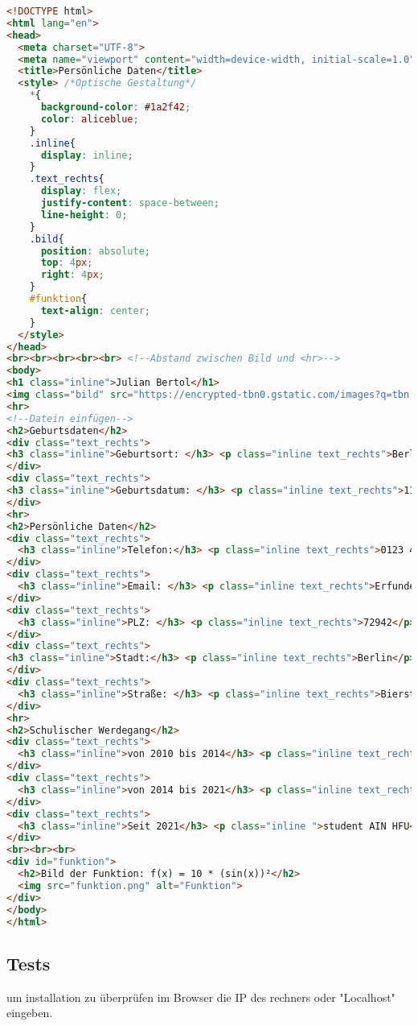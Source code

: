 \documentclass[a4paper,11pt,titlepage]{article}
\begin{document}
\begin{lstlisting}[language=HTML]
<!DOCTYPE html>
<html lang="en">
<head>
  <meta charset="UTF-8">
  <meta name="viewport" content="width=device-width, initial-scale=1.0">
  <title>Persönliche Daten</title>
  <style> /*Optische Gestaltung*/
    *{
      background-color: #1a2f42;
      color: aliceblue;
    }
    .inline{
      display: inline;
    }
    .text_rechts{
      display: flex;
      justify-content: space-between;
      line-height: 0;
    }
    .bild{
      position: absolute;
      top: 4px;
      right: 4px;
    }
    #funktion{
      text-align: center;
    }
  </style>
</head>
<br><br><br><br><br> <!--Abstand zwischen Bild und <hr>-->
<body>
<h1 class="inline">Julian Bertol</h1>
<img class="bild" src="https://encrypted-tbn0.gstatic.com/images?q=tbn:ANd9GcSUJWPiDRfILyD7anfbnIkdpwawXmn-PpbuOD6fSqzRcQ&s" alt="Foto">
<hr>
<!--Datein einfügen-->
<h2>Geburtsdaten</h2>
<div class="text_rechts">
<h3 class="inline">Geburtsort: </h3> <p class="inline text_rechts">Berlin</p>
</div>
<div class="text_rechts">
<h3 class="inline">Geburtsdatum: </h3> <p class="inline text_rechts">11.11.2011</p>
</div>
<hr>
<h2>Persönliche Daten</h2>
<div class="text_rechts">
  <h3 class="inline">Telefon:</h3> <p class="inline text_rechts">0123 4348211</p>
</div>
<div class="text_rechts">
  <h3 class="inline">Email: </h3> <p class="inline text_rechts">Erfunden@mail.de</p>
</div>
<div class="text_rechts">
  <h3 class="inline">PLZ: </h3> <p class="inline text_rechts">72942</p>
</div>
<div class="text_rechts">
<h3 class="inline">Stadt:</h3> <p class="inline text_rechts">Berlin</p>
</div>
<div class="text_rechts">
  <h3 class="inline">Straße: </h3> <p class="inline text_rechts">Bierstraße 10</p>
</div>
<hr>
<h2>Schulischer Werdegang</h2>
<div class="text_rechts">
  <h3 class="inline">von 2010 bis 2014</h3> <p class="inline text_rechts">Grundschule</p>
</div>
<div class="text_rechts">
  <h3 class="inline">von 2014 bis 2021</h3> <p class="inline text_rechts">Gymnasium</p>
</div>
<div class="text_rechts">
  <h3 class="inline">Seit 2021</h3> <p class="inline ">student AIN HFU</p>
</div>
<br><br><br>
<div id="funktion">
  <h2>Bild der Funktion: f(x) = 10 * (sin(x))²</h2>
  <img src="funktion.png" alt="Funktion">
</div>
</body>
</html>
\end{lstlisting}

\subsection{Tests}
um installation zu \"uberpr\"ufen im Browser die IP des rechners oder "Localhost" eingeben.
\end{document}
